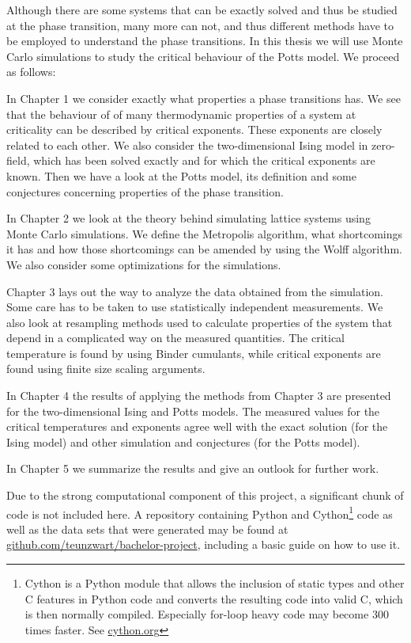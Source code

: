 \documentclass[11pt, a4paper]{report} %
\begin{document}
Although there are some systems that can be exactly solved and thus be studied at the phase transition, many more can not, and thus different methods have to be employed to understand the phase transitions.
In this thesis we will use Monte Carlo simulations to study the critical behaviour of the Potts model.
We proceed as follows:

In Chapter 1 we consider exactly what properties a phase transitions has.
We see that the behaviour of of many thermodynamic properties of a system at criticality can be described by critical exponents.
These exponents are closely related to each other.
We also consider the two-dimensional Ising model in zero-field, which has been solved exactly and for which the critical exponents are known.
Then we have a look at the Potts model, its definition and some conjectures concerning properties of the phase transition.

In Chapter 2 we look at the theory behind simulating lattice systems using Monte Carlo simulations.
We define the Metropolis algorithm, what shortcomings it has and how those shortcomings can be amended by using the Wolff algorithm.
We also consider some optimizations for the simulations.

Chapter 3 lays out the way to analyze the data obtained from the simulation.
Some care has to be taken to use statistically independent measurements.
We also look at resampling methods used to calculate properties of the system that depend in a complicated way on the measured quantities.
The critical temperature is found by using Binder cumulants, while critical exponents are found using finite size scaling arguments.

In Chapter 4 the results of applying the methods from Chapter 3 are presented for the two-dimensional Ising and Potts models.
The measured values for the critical temperatures and exponents agree well with the exact solution (for the Ising model) and other simulation and conjectures (for the Potts model).

In Chapter 5 we summarize the results and give an outlook for further work.

Due to the strong computational component of this project, a significant chunk of code is not included here.
A repository containing Python and Cython\footnote{Cython is a Python module that allows the inclusion of static types and other C features in Python code and converts the resulting code into valid C, which is then normally compiled. Especially for-loop heavy code may become 300 times faster. See \url{cython.org}} code as well as the data sets that were generated may be found at \url{github.com/teunzwart/bachelor-project}, including a basic guide on how to use it.
\end{document}
